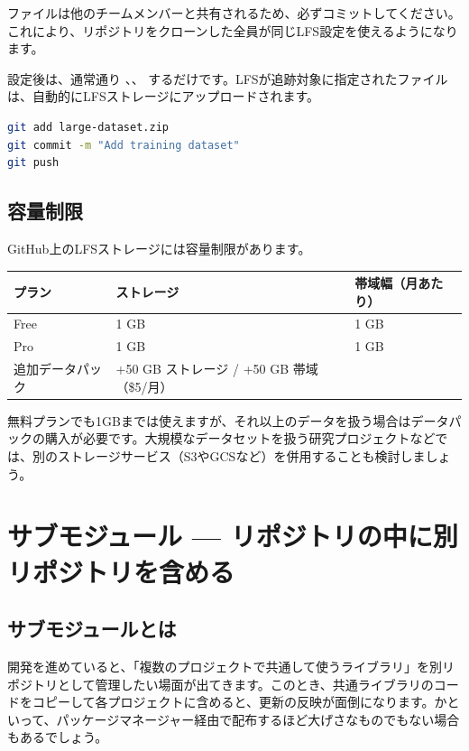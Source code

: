  ファイルは他のチームメンバーと共有されるため、必ずコミットしてください。これにより、リポジトリをクローンした全員が同じLFS設定を使えるようになります。

設定後は、通常通り 、、 するだけです。LFSが追跡対象に指定されたファイルは、自動的にLFSストレージにアップロードされます。

\begin{lstlisting}[language=bash]
git add large-dataset.zip
git commit -m "Add training dataset"
git push
\end{lstlisting}

\subsection{容量制限}

GitHub上のLFSストレージには容量制限があります。

\begin{table}[h]
\centering
\begin{tabular}{lll}
\hline
プラン & ストレージ & 帯域幅（月あたり） \\
\hline
Free & 1 GB & 1 GB \\
Pro & 1 GB & 1 GB \\
追加データパック & +50 GB ストレージ / +50 GB 帯域（\$5/月） & \\
\hline
\end{tabular}
\end{table}

無料プランでも1GBまでは使えますが、それ以上のデータを扱う場合はデータパックの購入が必要です。大規模なデータセットを扱う研究プロジェクトなどでは、別のストレージサービス（S3やGCSなど）を併用することも検討しましょう。

\section{サブモジュール --- リポジトリの中に別リポジトリを含める}

\subsection{サブモジュールとは}

開発を進めていると、「複数のプロジェクトで共通して使うライブラリ」を別リポジトリとして管理したい場面が出てきます。このとき、共通ライブラリのコードをコピーして各プロジェクトに含めると、更新の反映が面倒になります。かといって、パッケージマネージャー経由で配布するほど大げさなものでもない場合もあるでしょう。

